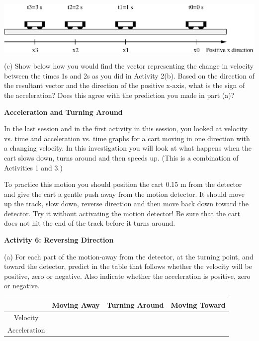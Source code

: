 \vspace{0.3cm}
{\par\centering \includegraphics{slowing/slowing_fig4.eps} \par}
\vspace{0.3cm}

(c) Show below how you would find the vector representing the change in velocity
between the times 1s and 2s as you did in Activity 2(b). Based on the 
direction of the resultant vector and the direction of the positive x-axis, 
what is the sign of the acceleration? 
Does this agree with the prediction you made in part (a)?
\vspace{15mm}

\textbf{Acceleration and Turning Around }

In the last session and in the first activity in this session, you looked at
velocity vs. time and acceleration vs. time graphs for a cart moving in one
direction with a changing velocity. In this investigation you will look at what
happens when the cart slows down, turns around and then speeds up. (This is a
combination of Activities 1 and 3.)

To practice this motion you should position the cart 0.15 m from the detector
and give the cart a gentle push away from the motion detector. It should move
up the track, slow down, reverse direction and then move back down toward the
detector. Try it without activating the motion detector! Be sure that the cart
does not hit the end of the track before it turns around. 

\textbf{Activity 6: Reversing Direction }

(a) For each part of the motion-away from the detector, at the turning point,
and toward the detector, predict in the table that follows whether the velocity
will be positive, zero or negative. Also indicate whether the acceleration is
positive, zero or negative.

\vspace{0.3cm}
{\centering \begin{tabular}{|c|c|c|c|}
\hline 
&
Moving Away&
Turning Around&
Moving Toward\\
\hline 
Velocity&
&
&
\\
\hline 
Acceleration&
&
&
\\
\hline 
\end{tabular}\par}
\vspace{0.3cm}

